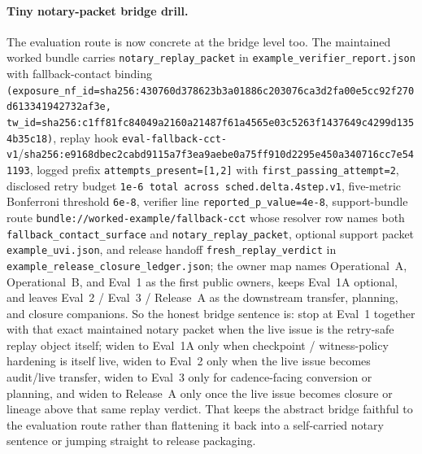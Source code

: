 \documentclass[11pt]{article}
\begin{document}
\paragraph{Tiny notary-packet bridge drill.}
The evaluation route is now concrete at the bridge level too. The maintained worked bundle carries \nolinkurl{notary\_replay\_packet} in \nolinkurl{example\_verifier\_report.json} with fallback-contact binding \nolinkurl{(exposure\_nf\_id=sha256:430760d378623b3a01886c203076ca3d2fa00e5cc92f270d613341942732af3e, tw\_id=sha256:c1ff81fc84049a2160a21487f61a4565e03c5263f1437649c4299d1354b35c18)}, replay hook \nolinkurl{eval-fallback-cct-v1}/\nolinkurl{sha256:e9168dbec2cabd9115a7f3ea9aebe0a75ff910d2295e450a340716cc7e541193}, logged prefix \nolinkurl{attempts\_present=[1,2]} with \nolinkurl{first\_passing\_attempt=2}, disclosed retry budget \nolinkurl{1e-6 total across sched.delta.4step.v1}, five-metric Bonferroni threshold \nolinkurl{6e-8}, verifier line \nolinkurl{reported\_p\_value=4e-8}, support-bundle route \nolinkurl{bundle://worked-example/fallback-cct} whose resolver row names both \nolinkurl{fallback_contact_surface} and \nolinkurl{notary_replay_packet}, optional support packet \nolinkurl{example\_uvi.json}, and release handoff \nolinkurl{fresh\_replay\_verdict} in \nolinkurl{example\_release\_closure\_ledger.json}; the owner map names Operational~A, Operational~B, and Eval~1 as the first public owners, keeps Eval~1A optional, and leaves Eval~2 / Eval~3 / Release~A as the downstream transfer, planning, and closure companions.
So the honest bridge sentence is: stop at Eval~1 together with that exact maintained notary packet when the live issue is the retry-safe replay object itself; widen to Eval~1A only when checkpoint / witness-policy hardening is itself live, widen to Eval~2 only when the live issue becomes audit/live transfer, widen to Eval~3 only for cadence-facing conversion or planning, and widen to Release~A only once the live issue becomes closure or lineage above that same replay verdict. That keeps the abstract bridge faithful to the evaluation route rather than flattening it back into a self-carried notary sentence or jumping straight to release packaging.\cite{series:evalnotary,series:evalnotaryaddendum,series:advantagecontracts,series:eval3,series:releaseproperty,series:workedexample}
\end{document}
